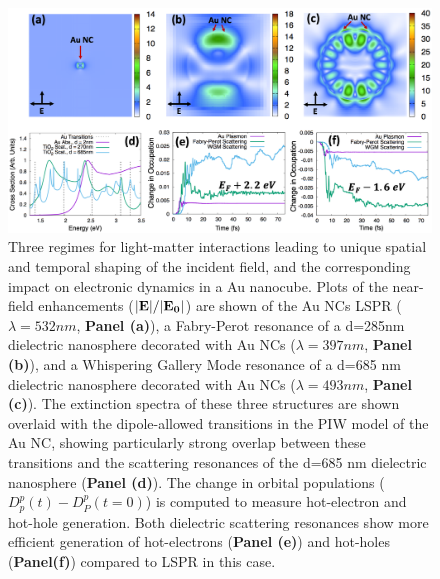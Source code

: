 \documentclass[journal=jpclcd,manuscript=letter]{achemso}
\begin{document}
\begin{figure}
\begin{center}
\includegraphics[width=6in]{figs/Au_AllThree_Alternate.png}
\caption{Three regimes for light-matter interactions leading to unique
spatial and temporal shaping of the incident field, and the corresponding
impact on electronic dynamics in a Au nanocube. Plots of the near-field enhancements (${\bf |E|}/{\bf |E_0|}$) are shown of the
Au NCs LSPR ($\lambda=532 nm$, {\bf Panel (a)}), a Fabry-Perot resonance of a d=285nm dielectric nanosphere decorated with Au NCs ($\lambda = 397 nm$, {\bf Panel (b)}),
and a Whispering Gallery Mode resonance of a d=685 nm dielectric nanosphere decorated with Au NCs ($\lambda = 493 nm$, {\bf Panel (c)}).
The extinction spectra of these three structures are shown overlaid with the dipole-allowed transitions in the PIW model of the Au NC, showing particularly
strong overlap between these transitions and the scattering resonances of the d=685 nm dielectric nanosphere ({\bf Panel (d)}).
The change in orbital populations ($D_p^p(t)-D_P^p(t=0)$) is computed to measure hot-electron and hot-hole generation.
Both dielectric scattering resonances show more efficient generation of hot-electrons ({\bf Panel (e)}) and hot-holes ({\bf Panel(f)}) compared to LSPR in this case.}
\end{center}
\end{figure}
\end{document}
